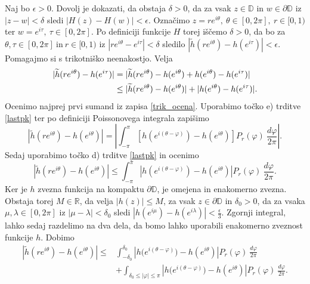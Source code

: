 \documentclass[mat1, tisk]{fmfdelo}
\begin{document}
\begin{dokaz}
        Naj bo $\epsilon >0$. Dovolj je dokazati, da obstaja $\delta >0$, da za vsak $z \in \mathbb{D}$ in $w \in \partial \mathbb{D}$ iz $|z - w| < \delta$ sledi $|H(z) - H(w)| < \epsilon$. 
        Označimo $z = r e^{i \theta},~\theta \in [0,2\pi],~r \in [0,1)$ ter $w = e^{i \tau},~\tau \in [0,2\pi]$.
        Po definiciji funkcije $H$ torej iščemo $\delta >0$, da bo za $\theta, \tau \in [0,2\pi]~\text{in}~r \in [0,1)$ iz $|r e^{i \theta} - e^{i\tau}| < \delta$ sledilo $|\widetilde{h}(r e^{i \theta}) - h(e^{i\tau})| < \epsilon$.
        Pomagajmo si s trikotniško neenakostjo. Velja
        \begin{align}
            \label{trik_ocena}
            |\widetilde{h}(r e^{i \theta}) - h(e^{i\tau})| &= |\widetilde{h}(r e^{i \theta}) - h(e^{i \theta}) + h(e^{i \theta}) - h(e^{i\tau})| \notag \\
            &\leq |\widetilde{h}(r e^{i \theta}) - h(e^{i\theta})| + |h(e^{i\theta}) - h(e^{i\tau})|.
        \end{align}
        Ocenimo najprej prvi sumand iz zapisa \eqref{trik_ocena}. Uporabimo točko e) trditve \ref{lastpk} ter po definiciji Poissonovega integrala zapišimo
        $$
            \left|\widetilde{h}(r e^{i \theta}) - h(e^{i\theta})\right| = \left|\int_{-\pi}^{\pi}{\left[h\left(e^{i(\theta - \varphi)}\right) - h\left(e^{i\theta}\right)\right]P_r(\varphi)~\frac{d\varphi}{2 \pi}}\right|.
        $$
        Sedaj uporabimo točko d) trditve \ref{lastpk} in ocenimo
        $$
        \left|\widetilde{h}(r e^{i \theta}) - h(e^{i\theta})\right| \leq \int_{-\pi}^{\pi}{\left| h\left(e^{i(\theta - \varphi)}\right) - h \left(e^{i\theta}\right) \right|P_r(\varphi)~\frac{d\varphi}{2 \pi}}.
        $$ 
        Ker je $h$ zvezna funkcija na kompaktu $\partial \mathbb{D}$, je omejena in enakomerno zvezna.  
        Obstaja torej $M \in \mathbb{R}$, da velja $|h(z)| \leq M$, za vsak $z \in \partial \mathbb{D}$ in $\delta_0 >0$, da za vsaka $\mu, \lambda \in [0,2\pi]$ iz $|\mu - \lambda| < \delta_0$ sledi $|h(e^{i \mu}) - h(e^{i \lambda})| < \frac{\epsilon}{3}$.
        Zgornji integral, lahko sedaj razdelimo na dva dela, da bomo lahko uporabili enakomerno zveznost funkcije $h$. Dobimo
        \begin{align*}
            \left|\widetilde{h}(re^{i\theta}) - h(e^{i\theta})\right| \leq & \int_{-\delta_0}^{\delta_0}{\left| h\big(e^{i(\theta - \varphi)}\big) - h(e^{i\theta})\right|P_r(\varphi)~\frac{d\varphi}{2\pi}}\\
            & + \int_{\delta_0 \leq |\varphi| \leq \pi}{\left| h\big(e^{i(\theta - \varphi)}\big) - h(e^{i\theta})\right|P_r(\varphi)~\frac{d\varphi}{2\pi}}.

\end{align*}
\end{dokaz}
\end{document}
